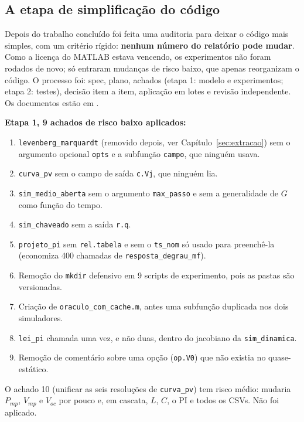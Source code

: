 \subsection{A etapa de simplifica\c{c}\~ao do c\'odigo}

Depois do trabalho conclu\'ido foi feita uma auditoria para deixar o c\'odigo mais simples, com um crit\'erio r\'igido: \textbf{nenhum n\'umero do relat\'orio pode mudar}. Como a licen\c{c}a do MATLAB estava vencendo,
os experimentos n\~ao foram rodados de novo; s\'o entraram mudan\c{c}as de risco baixo, que apenas reorganizam o c\'odigo. O processo foi: spec, plano, achados (etapa 1: modelo e experimentos; etapa 2: testes),
decis\~ao item a item, aplica\c{c}\~ao em lotes e revis\~ao independente. Os documentos est\~ao em .

\textbf{Etapa 1, 9 achados de risco baixo aplicados:}
\begin{enumerate}
\item \texttt{levenberg\_marquardt} (removido depois, ver Cap\'itulo~\ref{sec:extracao}) sem o argumento opcional \texttt{opts} e a subfun\c{c}\~ao \texttt{campo}, que ningu\'em usava.
\item \texttt{curva\_pv} sem o campo de sa\'ida \texttt{c.Vj}, que ningu\'em lia.
\item \texttt{sim\_medio\_aberta} sem o argumento \texttt{max\_passo} e sem a generalidade de $G$ como fun\c{c}\~ao do tempo.
\item \texttt{sim\_chaveado} sem a sa\'ida \texttt{r.q}.
\item \texttt{projeto\_pi} sem \texttt{rel.tabela} e sem o \texttt{ts\_nom} s\'o usado para preench\^e-la (economiza 400 chamadas de \texttt{resposta\_degrau\_mf}).
\item Remo\c{c}\~ao do \texttt{mkdir} defensivo em 9 scripts de experimento, pois as pastas s\~ao versionadas.
\item Cria\c{c}\~ao de \texttt{oraculo\_com\_cache.m}, antes uma subfun\c{c}\~ao duplicada nos dois simuladores.
\item \texttt{lei\_pi} chamada uma vez, e n\~ao duas, dentro do jacobiano da \texttt{sim\_dinamica}.
\item Remo\c{c}\~ao de coment\'ario sobre uma op\c{c}\~ao (\texttt{op.V0}) que n\~ao existia no quase-est\'atico.
\end{enumerate}
O achado 10 (unificar as seis resolu\c{c}\~oes de \texttt{curva\_pv}) tem risco m\'edio: mudaria $P_{mp}$, $V_{mp}$ e $V_{oc}$ por pouco e, em cascata, $L$, $C$, o PI e todos os CSVs. N\~ao foi aplicado.


